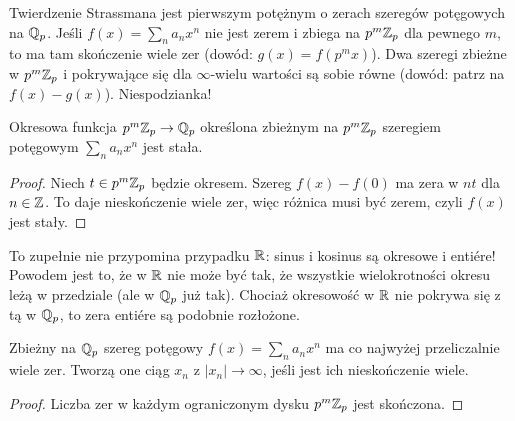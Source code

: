 Twierdzenie Strassmana jest pierwszym potężnym o zerach szeregów potęgowych na $\mathbb Q_p$.
Jeśli $f(x) = \sum_n a_n x^n$ nie jest zerem i zbiega na $p^m \mathbb Z_p$ dla pewnego $m$, to ma tam skończenie wiele zer (dowód: $g(x) = f(p^mx)$).
Dwa szeregi zbieżne w $p^m\mathbb Z_p$ i pokrywające się dla $\infty$-wielu wartości są sobie równe (dowód: patrz na $f(x) - g(x)$). Niespodzianka!

\begin{fakt} \label{arcis}
	Okresowa funkcja $p^m \mathbb Z_p \to \mathbb Q_p$ określona zbieżnym na $p^m \mathbb Z_p$ szeregiem potęgowym $\sum_n a_n x^n$ jest stała.
\end{fakt}

\begin{proof}
	Niech $t \in p^m\mathbb Z_p$ będzie okresem.
	Szereg $f(x)-f(0)$ ma zera w $n t$ dla $n \in \mathbb Z$.
	To daje nieskończenie wiele zer, więc różnica musi być zerem, czyli $f(x)$ jest stały.
\end{proof}

To zupełnie nie przypomina przypadku $\mathbb R$: sinus i kosinus są okresowe i entiére!
Powodem jest to, że w $\mathbb R$ nie może być tak, że wszystkie wielokrotności okresu leżą w przedziale (ale w $\mathbb Q_p$ już tak).
Chociaż okresowość w $\mathbb R$ nie pokrywa się z tą w $\mathbb Q_p$, to zera entiére są podobnie rozłożone.

\begin{fakt}
	Zbieżny na $\mathbb Q_p$ szereg potęgowy $f(x) = \sum_n a_n x^n$ ma co najwyżej przeliczalnie wiele zer.
	Tworzą one ciąg $x_n$ z $|x_n| \to \infty$, jeśli jest ich nieskończenie wiele.
\end{fakt}

\begin{proof}
	Liczba zer w każdym ograniczonym dysku $p^m \mathbb Z_p$ jest skończona.
\end{proof}
